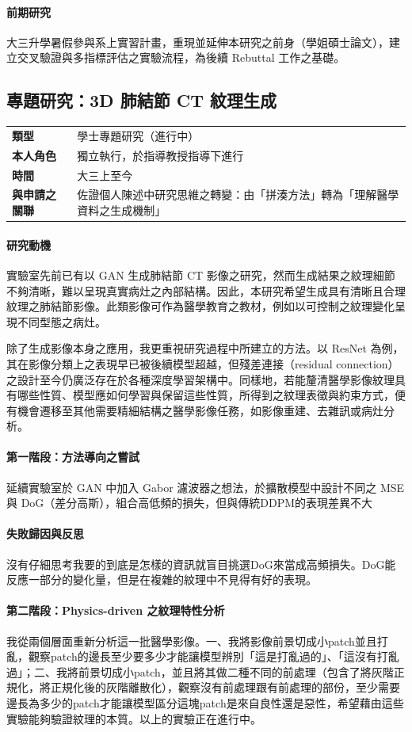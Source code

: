 \documentclass[12pt,a4paper]{article}
\newcommand{\itemsummary}[4]{%
\begin{center}
\begin{tabularx}{\linewidth}{>{\bfseries}l X}
\toprule
類型 & #1 \\
本人角色 & #2 \\
時間 & #3 \\
與申請之關聯 & #4 \\
\bottomrule
\end{tabularx}
\end{center}
}
\begin{document}
\paragraph{前期研究}
大三升學暑假參與系上實習計畫，重現並延伸本研究之前身（學姐碩士論文），建立交叉驗證與多指標評估之實驗流程，為後續 Rebuttal 工作之基礎。

% 

\newpage
\subsection{專題研究：3D 肺結節 CT 紋理生成}

\itemsummary
{學士專題研究（進行中）}
{獨立執行，於指導教授指導下進行}
{大三上至今}
{佐證個人陳述中研究思維之轉變：由「拼湊方法」轉為「理解醫學資料之生成機制」}

\paragraph{研究動機}
實驗室先前已有以 GAN 生成肺結節 CT 影像之研究，然而生成結果之紋理細節不夠清晰，難以呈現真實病灶之內部結構。因此，本研究希望生成具有清晰且合理紋理之肺結節影像。此類影像可作為醫學教育之教材，例如以可控制之紋理變化呈現不同型態之病灶。

除了生成影像本身之應用，我更重視研究過程中所建立的方法。以 ResNet 為例，其在影像分類上之表現早已被後續模型超越，但殘差連接（residual connection）之設計至今仍廣泛存在於各種深度學習架構中。同樣地，若能釐清醫學影像紋理具有哪些性質、模型應如何學習與保留這些性質，所得到之紋理表徵與約束方式，便有機會遷移至其他需要精細結構之醫學影像任務，如影像重建、去雜訊或病灶分析。

\paragraph{第一階段：方法導向之嘗試}
延續實驗室於 GAN 中加入 Gabor 濾波器之想法，於擴散模型中設計不同之 MSE 與 DoG（差分高斯），組合高低頻的損失，但與傳統DDPM的表現差異不大

\paragraph{失敗歸因與反思}
沒有仔細思考我要的到底是怎樣的資訊就盲目挑選DoG來當成高頻損失。DoG能反應一部分的變化量，但是在複雜的紋理中不見得有好的表現。

\paragraph{第二階段：Physics-driven 之紋理特性分析}
我從兩個層面重新分析這一批醫學影像。一、我將影像前景切成小patch並且打亂，觀察patch的邊長至少要多少才能讓模型辨別「這是打亂過的」、「這沒有打亂過」；二、我將前景切成小patch，並且將其做二種不同的前處理（包含了將灰階正規化，將正規化後的灰階離散化），觀察沒有前處理跟有前處理的部份，至少需要邊長為多少的patch才能讓模型區分這塊patch是來自良性還是惡性，希望藉由這些實驗能夠驗證紋理的本質。以上的實驗正在進行中。
\end{document}
